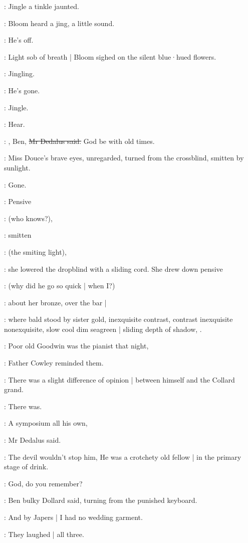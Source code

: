 :
Jingle a tinkle jaunted.

:
Bloom heard a jing,
a little sound.

\BloomIntA:
He's off.

:
Light sob of breath |
Bloom sighed on the silent blue·hued flowers.

:
Jingling.

\BloomIntA:
He's gone.

:
Jingle.

\BloomIntA:
Hear.

\simon:
, Ben,
\sout{Mr Dedalus said.}
God be with old times.

:
Miss Douce's brave eyes,
unregarded,
turned from the crossblind,
smitten by sunlight.

\MissDInt:
Gone.

:
Pensive

\MissDInt:
(who knows?),

:
smitten

\MissDInt:
(the smiting light),

:
she lowered the dropblind with a sliding cord.
She drew down pensive

\MissDInt:
(why did he go so quick |
when I?)

:
about her bronze,
over the bar |

:
where bald stood by sister gold,
inexquisite contrast,
contrast inexquisite nonexquisite,
slow cool dim seagreen |
sliding depth of shadow,
.

\cowley:
Poor old Goodwin was the pianist that night,

:
Father Cowley reminded them.

\cowley:
There was a slight difference of opinion |
between himself and the Collard grand.

:
There was.

\simon:
A symposium all his own,

:
Mr Dedalus said.

\simon:
The devil wouldn't stop him,
He was a crotchety old fellow |
in the primary stage of drink.

\dollard:
God,
do you remember?

:
Ben bulky Dollard said,
turning from the punished keyboard.

\dollard:
And by Japers |
I had no wedding garment.

:
They laughed |
all three.

